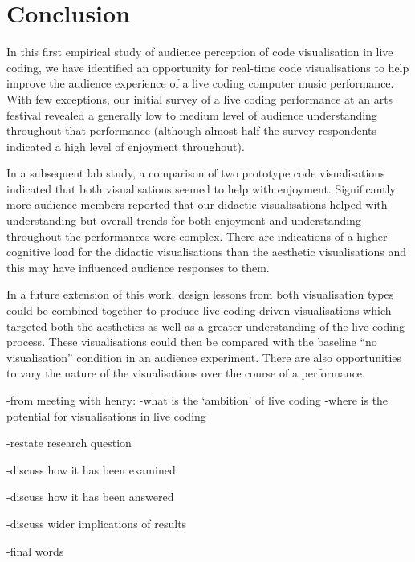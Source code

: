 
\chapter{Conclusion}
\label{chap:conclusion}


In this first empirical study of audience perception of code visualisation in live coding, we have identified an opportunity for real-time code visualisations to help improve the audience experience of a live coding computer music performance. With few exceptions, our initial survey of a live coding performance at an arts festival revealed a generally low to medium level of audience understanding throughout that performance (although almost half the survey respondents indicated a high level of enjoyment throughout).

In a subsequent lab study, a comparison of two prototype code visualisations indicated that both visualisations seemed to help with enjoyment. Significantly more audience members reported that our didactic visualisations helped with understanding but overall trends for both enjoyment and understanding throughout the performances were complex. There are indications of a higher cognitive load for the didactic visualisations than the aesthetic visualisations and this may have influenced audience responses to them.

In a future extension of this work, design lessons from both visualisation types could be combined together to produce live coding driven visualisations which targeted both the aesthetics as well as a greater understanding of the live coding process. These visualisations could then be compared with the baseline ``no visualisation'' condition in an audience experiment. There are also opportunities to vary the nature of the visualisations over the course of a performance.

-from meeting with henry:
	-what is the `ambition' of live coding
	-where is the potential for visualisations in live coding

-restate research question

-discuss how it has been examined

-discuss how it has been answered

-discuss wider implications of results

-final words
